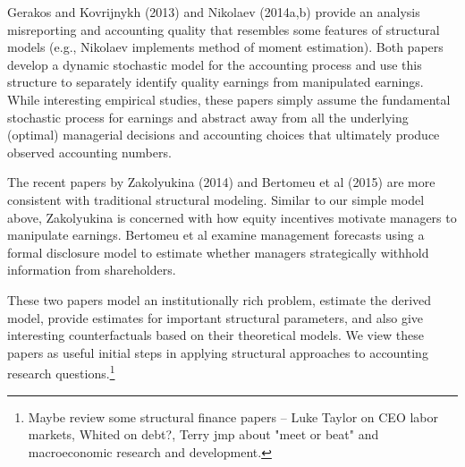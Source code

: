 Gerakos and Kovrijnykh (2013) and Nikolaev (2014a,b) provide an analysis misreporting and accounting quality that resembles some features of structural models (e.g., Nikolaev implements method of moment estimation). Both papers develop a dynamic stochastic model for the accounting process and use this structure to separately identify quality earnings from manipulated earnings. While interesting empirical studies, these papers simply assume the fundamental stochastic process for earnings and abstract away from all the underlying (optimal) managerial decisions and accounting choices that ultimately produce observed accounting numbers. 

The recent papers by Zakolyukina (2014) and Bertomeu et al (2015) are more consistent with traditional structural modeling.  Similar to our simple model above, Zakolyukina is concerned with how equity incentives motivate managers to manipulate earnings.  Bertomeu et al examine management forecasts using a formal disclosure model to estimate whether managers strategically withhold information from shareholders.

These two papers model an institutionally rich problem, estimate the derived model, provide estimates for important structural parameters, and also give interesting counterfactuals based on their theoretical models.  
We view these papers as useful initial steps in applying structural approaches to accounting research questions.\footnote{Maybe review some structural finance papers -- Luke Taylor on CEO labor markets, Whited on debt?, Terry jmp about "meet or beat" and macroeconomic research and development.} %

